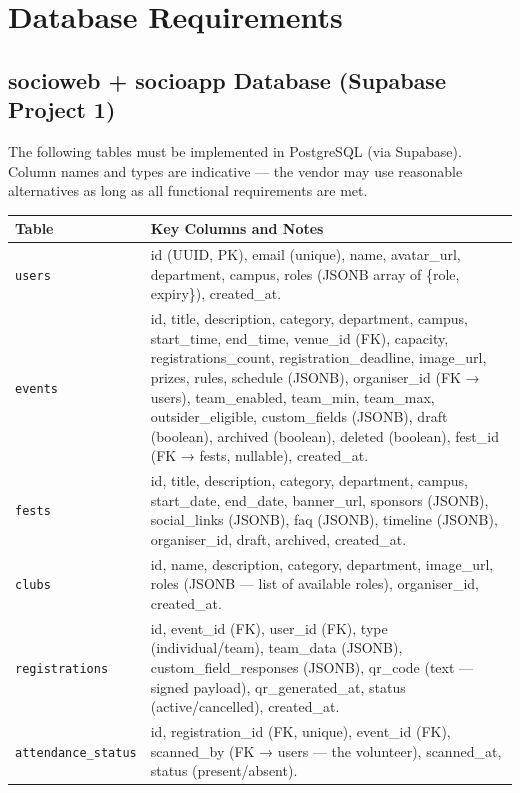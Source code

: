 \documentclass[12pt,a4paper]{article}
\begin{document}
\newpage
\section{Database Requirements}

\subsection{socioweb + socioapp Database (Supabase Project 1)}

The following tables must be implemented in PostgreSQL (via Supabase). Column names and types are indicative — the vendor may use reasonable alternatives as long as all functional requirements are met.

\begin{longtable}{L{4cm} X}
\toprule
{}
\textbf{Table} & \textbf{Key Columns and Notes} \\
\midrule
\endhead
\texttt{users} & id (UUID, PK), email (unique), name, avatar\_url, department, campus, roles (JSONB array of \{role, expiry\}), created\_at. \\
\addlinespace
\texttt{events} & id, title, description, category, department, campus, start\_time, end\_time, venue\_id (FK), capacity, registrations\_count, registration\_deadline, image\_url, prizes, rules, schedule (JSONB), organiser\_id (FK → users), team\_enabled, team\_min, team\_max, outsider\_eligible, custom\_fields (JSONB), draft (boolean), archived (boolean), deleted (boolean), fest\_id (FK → fests, nullable), created\_at. \\
\addlinespace
\texttt{fests} & id, title, description, category, department, campus, start\_date, end\_date, banner\_url, sponsors (JSONB), social\_links (JSONB), faq (JSONB), timeline (JSONB), organiser\_id, draft, archived, created\_at. \\
\addlinespace
\texttt{clubs} & id, name, description, category, department, image\_url, roles (JSONB — list of available roles), organiser\_id, created\_at. \\
\addlinespace
\texttt{registrations} & id, event\_id (FK), user\_id (FK), type (individual/team), team\_data (JSONB), custom\_field\_responses (JSONB), qr\_code (text — signed payload), qr\_generated\_at, status (active/cancelled), created\_at. \\
\addlinespace
\texttt{attendance\_status} & id, registration\_id (FK, unique), event\_id (FK), scanned\_by (FK → users — the volunteer), scanned\_at, status (present/absent). \\

\end{longtable}
\end{document}
